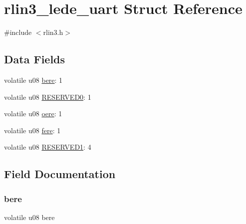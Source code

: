 \hypertarget{structrlin3__lede__uart}{}\section{rlin3\+\_\+lede\+\_\+uart Struct Reference}
\label{structrlin3__lede__uart}


{\ttfamily \#include $<$rlin3.\+h$>$}

\subsection*{Data Fields}
\begin{DoxyCompactItemize}
\item 
volatile u08 \mbox{\hyperlink{structrlin3__lede__uart_a3e2f097885e975d6a1098106f6b5a74a}{bere}}\+: 1
\item 
volatile u08 \mbox{\hyperlink{structrlin3__lede__uart_a59c0b30ccfb89f1b34e9682741859abd}{R\+E\+S\+E\+R\+V\+E\+D0}}\+: 1
\item 
volatile u08 \mbox{\hyperlink{structrlin3__lede__uart_a2eab456049805a3a0c23483a48dddfb9}{oere}}\+: 1
\item 
volatile u08 \mbox{\hyperlink{structrlin3__lede__uart_ac691420e46bd4b236478f4b47c210a52}{fere}}\+: 1
\item 
volatile u08 \mbox{\hyperlink{structrlin3__lede__uart_a715c3fdf1f14a6aa267daed3d2d6fba1}{R\+E\+S\+E\+R\+V\+E\+D1}}\+: 4
\end{DoxyCompactItemize}


\subsection{Field Documentation}
\mbox{\label{structrlin3__lede__uart_a3e2f097885e975d6a1098106f6b5a74a}} 
\subsubsection{\texorpdfstring{bere}{bere}}
{\footnotesize\ttfamily volatile u08 bere}

\mbox{\label{structrlin3__lede__uart_ac691420e46bd4b236478f4b47c210a52}} 
